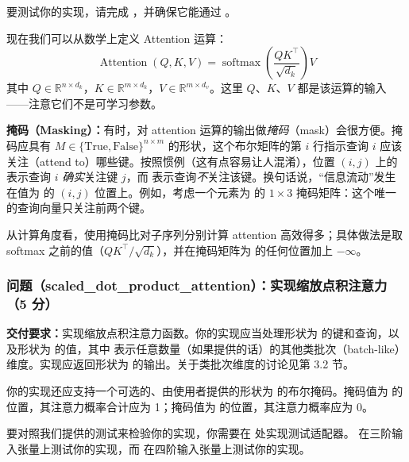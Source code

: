 {\sloppy
要测试你的实现，请完成 ，并确保它能通过 。
\par}

现在我们可以从数学上定义 Attention 运算：
\begin{equation}
\operatorname{Attention}(Q, K, V) = \operatorname{softmax}\!\left(\frac{QK^{\top}}{\sqrt{d_k}}\right)V
\tag{11}
\end{equation}
其中 $Q \in \mathbb{R}^{n \times d_k}$，$K \in \mathbb{R}^{m \times d_k}$，$V \in \mathbb{R}^{m \times d_v}$。这里 $Q$、$K$、$V$ 都是该运算的输入——注意它们不是可学习参数。

\textbf{掩码（Masking）：}有时，对 attention 运算的输出做\textit{掩码}（mask）会很方便。掩码应具有 $M \in \{\text{True}, \text{False}\}^{n \times m}$ 的形状，这个布尔矩阵的第 $i$ 行指示查询 $i$ 应该关注（attend to）哪些键。按照惯例（这有点容易让人混淆），位置 $(i, j)$ 上的  表示查询 $i$ \textit{确实}关注键 $j$，而  表示查询\textit{不}关注该键。换句话说，``信息流动''发生在值为  的 $(i, j)$ 位置上。例如，考虑一个元素为  的 $1 \times 3$ 掩码矩阵：这个唯一的查询向量只关注前两个键。

从计算角度看，使用掩码比对子序列分别计算 attention 高效得多；具体做法是取 softmax 之前的值（$QK^{\top} / \sqrt{d_k}$），并在掩码矩阵为  的任何位置加上 $-\infty$。

\subsubsection*{问题（scaled\_dot\_product\_attention）：实现缩放点积注意力（5 分）}

\textbf{交付要求：}实现缩放点积注意力函数。你的实现应当处理形状为  的键和查询，以及形状为  的值，其中  表示任意数量（如果提供的话）的其他类批次（batch-like）维度。实现应返回形状为  的输出。关于类批次维度的讨论见第 3.2 节。

你的实现还应支持一个可选的、由使用者提供的形状为  的布尔掩码。掩码值为  的位置，其注意力概率合计应为 1；掩码值为  的位置，其注意力概率应为 0。

要对照我们提供的测试来检验你的实现，你需要在  处实现测试适配器。 在三阶输入张量上测试你的实现，而  在四阶输入张量上测试你的实现。

